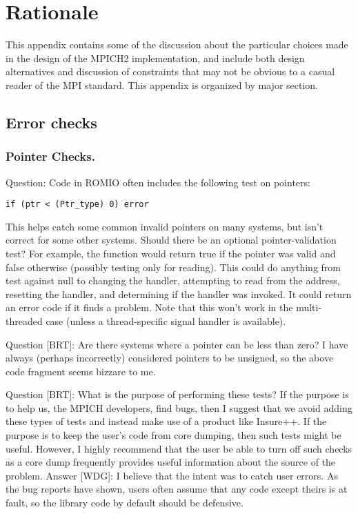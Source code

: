 \documentclass{article}
\begin{document}


\ifrationale
\section{Rationale}
\label{sec:rationale}

This appendix contains some of the discussion about the particular choices
made in the design of the MPICH2 implementation, and include both design
alternatives and discussion of constraints that may not be obvious to a casual
reader of the MPI standard.  This appendix is organized by major section.

\subsection{Error checks}

\subsubsection{Pointer Checks.}
Question: Code in ROMIO often includes the following test on pointers:
\begin{verbatim}
if (ptr < (Ptr_type) 0) error
\end{verbatim}
This helps catch some common invalid pointers on many systems, but isn't
correct for some other systems.  Should there be an optional
pointer-validation test?  For example, the function
 would return true if the pointer was valid and
false otherwise (possibly testing only for reading).  This could do anything
from test against null to changing the  handler, attempting to
read from the address, resetting the handler, and determining if the handler
was invoked.  It could return an error code if it finds a problem.
Note that this won't work in the multi-threaded case (unless a
thread-specific signal handler is available).

Question [BRT]: Are there systems where a pointer can be less
than zero?  I have always (perhaps incorrectly) considered pointers to
be unsigned, so the above code fragment seems bizzare to me.  

Question [BRT]: What is the purpose of performing these tests?  If the
purpose is to help us, the MPICH developers, find bugs, then I suggest
that we avoid adding these types of tests and instead make use of a
product like Insure++.  If the purpose is to keep the user's code from
core dumping, then such tests might be useful.  However, I highly
recommend that the user be able to turn off such checks as a core dump
frequently provides useful information about the source of the
problem.
Answer [WDG]: I believe that the intent was to catch user errors.  As the bug
reports have shown, users often assume that any code except theirs is at
fault, so the library code by default should be defensive.  
\end{document}
